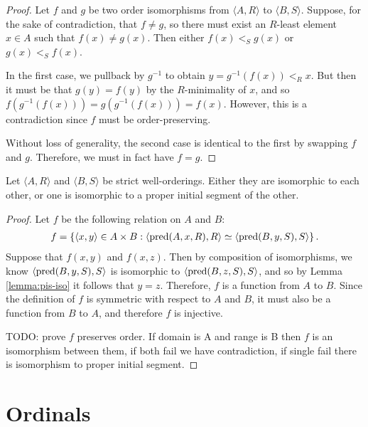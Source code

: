 \begin{proof}
    Let $f$ and $g$ be two order isomorphisms from $\langle A, R \rangle$ to $\langle B, S \rangle$. Suppose, for the sake of contradiction, that $f \neq g$, so there must exist an $R$-least element $x \in A$ such that $f(x) \neq g(x)$. Then either $f(x) <_{S} g(x)$ or $g(x) <_{S} f(x)$.

    In the first case, we pullback by $g^{-1}$ to obtain $y = g^{-1}(f(x)) <_{R} x$. But then it must be that $g(y) = f(y)$ by the $R$-minimality of $x$, and so $f\left(g^{-1}(f(x))\right) = g(g^{-1}(f(x))) = f(x)$. However, this is a contradiction since $f$ must be order-preserving.

    Without loss of generality, the second case is identical to the first by swapping $f$ and $g$. Therefore, we must in fact have $f = g$.
\end{proof}

\begin{thm}\label{thm:well-ordering-isomorphisms}
    Let $\langle A, R \rangle$ and $\langle B, S \rangle$ be strict well-orderings. Either they are isomorphic to each other, or one is isomorphic to a proper initial segment of the other.
\end{thm}

\begin{proof}
    Let $f$ be the following relation on $A$ and $B$:
    \begin{align*}
        f = \left\{\langle x, y \rangle \in A \times B : \langle \operatorname{pred}(A, x, R), R \rangle \simeq \langle \operatorname{pred}(B, y, S), S \rangle\right\}.
    \end{align*}
    Suppose that $f(x, y)$ and $f(x, z)$. Then by composition of isomorphisms, we know $\langle \operatorname{pred}(B, y, S), S \rangle$ is isomorphic to $\langle \operatorname{pred}(B, z, S), S \rangle$, and so by Lemma \ref{lemma:pis-iso} it follows that $y = z$. Therefore, $f$ is a function from $A$ to $B$. Since the definition of $f$ is symmetric with respect to $A$ and $B$, it must also be a function from $B$ to $A$, and therefore $f$ is injective.

    {\color{red}TODO: prove $f$ preserves order. If domain is A and range is B then $f$ is an isomorphism between them, if both fail we have contradiction, if single fail there is isomorphism to proper initial segment.}
\end{proof}

\section{Ordinals}

